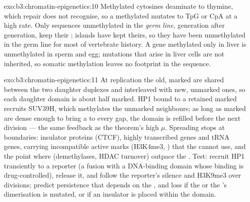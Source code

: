 \begin{solution}{exo:b3:chromatin-epigenetics:10}
Methylated cytosines deaminate to thymine, which repair does not
recognise, so a methylated  mutates to TpG or CpA at a high rate.
Only sequences unmethylated in the \emph{germ line}, generation after
generation, keep their ; islands have kept theirs, so they have
been unmethylated in the germ line for most of vertebrate history.
A gene methylated only in liver is unmethylated in sperm and egg;
mutations that arise in liver cells are not inherited, so somatic
methylation leaves no footprint in the sequence.
\end{solution}

\begin{solution}{exo:b3:chromatin-epigenetics:11}
At replication the old, marked  are shared between the two
daughter duplexes and interleaved with new, unmarked ones, so each
daughter domain is about half marked. HP1 bound to a retained marked
 recruits SUV39H, which methylates the unmarked neighbours;
as long as marked  are dense enough to bring a  to
every gap, the domain is refilled before the next division --- the
same feedback as the theorem's high $\mu$. Spreading stops at
boundaries: insulator proteins (CTCF), highly transcribed genes and
tRNA genes,  carrying incompatible active marks (H3K4me3,
) that the  cannot use, and the point where 
(demethylases, HDAC turnover) outpace the . Test: recruit HP1
transiently to a reporter (a fusion with a DNA-binding domain whose
binding is drug-controlled), release it, and follow the reporter's
silence and H3K9me3 over divisions; predict persistence that depends
on the , and loss if the  or the 's dimerisation is
mutated, or if an insulator is placed within the domain.
\end{solution}


